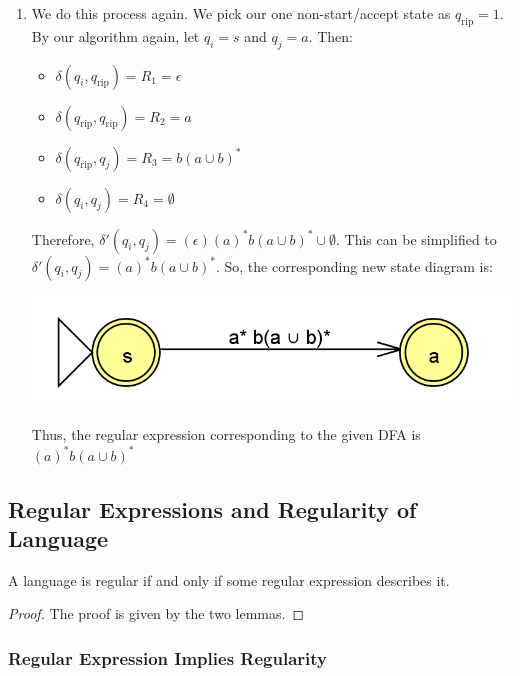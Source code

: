 \documentclass[letterpaper]{article}
\begin{document}
\begin{enumerate}
    \item We do this process again. We pick our one non-start/accept state as $q_{\text{rip}} = 1$. By our algorithm again, let $q_i = s$ and $q_j = a$. Then: 
    \begin{itemize}
        \item $\delta(q_i, q_{\text{rip}}) = R_1 = \epsilon$
        \item $\delta(q_{\text{rip}}, q_{\text{rip}}) = R_2 = a$
        \item $\delta(q_{\text{rip}}, q_j) = R_3 = b(a \cup b)^*$
        \item $\delta(q_i, q_j) = R_4 = \emptyset$
    \end{itemize}
    Therefore, $\delta'(q_i, q_j) = (\epsilon)(a)^* b(a \cup b)^* \cup \emptyset$. This can be simplified to $\delta'(q_i, q_j) = (a)^* b(a \cup b)^*$. So, the corresponding new state diagram is:
    \begin{center}
        \includegraphics[scale=0.4]{assets/dfa_regex_4.png}
    \end{center}
    Thus, the regular expression corresponding to the given DFA is $\boxed{(a)^* b(a \cup b)^*}$
\end{enumerate}



\subsection{Regular Expressions and Regularity of Language}
\begin{theorem}{}{}
    A language is regular if and only if some regular expression describes it. 
\end{theorem}

\begin{mdframed}[]
    \begin{proof}
        The proof is given by the two lemmas. 
    \end{proof}    
\end{mdframed}

\subsubsection{Regular Expression Implies Regularity}
\end{document}
